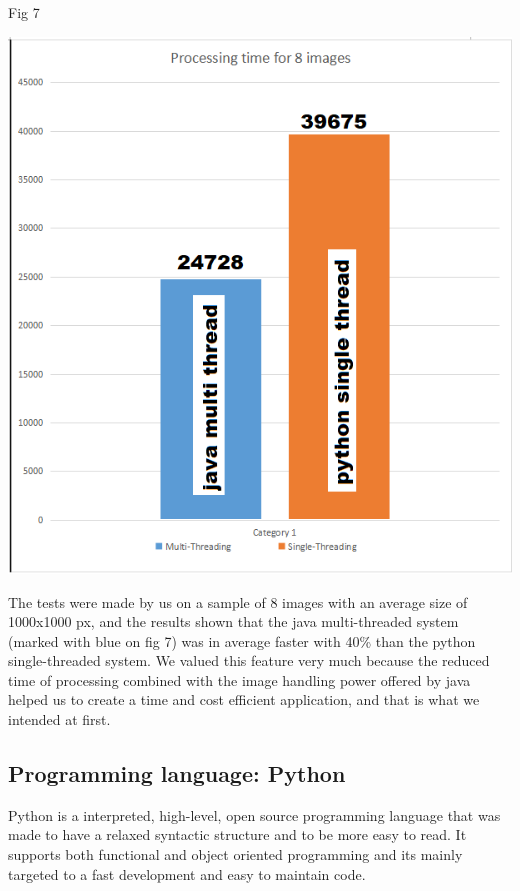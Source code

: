 \documentclass[12pt, a4paper]{report}
\begin{document}
\bigskip

\begin{center}
Fig 7
\end{center}
\par 
\includegraphics[scale=0.7, center]{multi_thread2.png}

\quad
The tests were made by us on a sample of 8 images with an average size of 1000x1000 px, and the results shown that the java multi-threaded system (marked with blue on fig 7) was in average faster with 40\% than the python single-threaded system. We valued this feature very much because the reduced time of processing combined with the image handling power offered by java helped us to create a time and cost efficient application, and that is what we intended at first.


\subsection{Programming language: Python}
\medskip

\quad
Python is a interpreted, high-level, open source programming language that was made to have a  relaxed syntactic structure and to be more easy to read. It supports both functional and object oriented programming and its mainly targeted to a fast development and easy to maintain code.
\par
\end{document}
